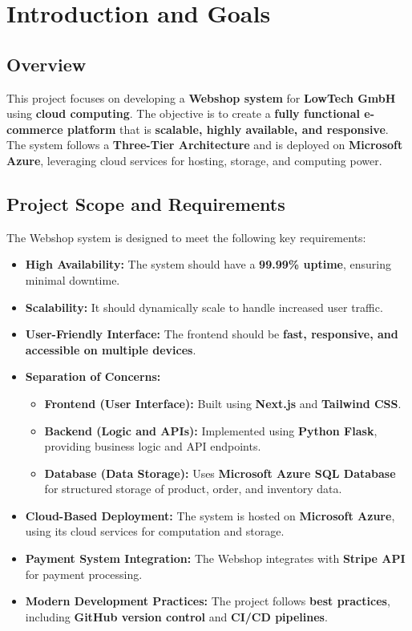 \section{Introduction and Goals}

\subsection{Overview}
This project focuses on developing a \textbf{Webshop system} for \textbf{LowTech GmbH} using \textbf{cloud computing}. The objective is to create a \textbf{fully functional e-commerce platform} that is \textbf{scalable, highly available, and responsive}. The system follows a \textbf{Three-Tier Architecture} and is deployed on \textbf{Microsoft Azure}, leveraging cloud services for hosting, storage, and computing power.

\subsection{Project Scope and Requirements}
The Webshop system is designed to meet the following key requirements:

\begin{itemize}
    \item \textbf{High Availability:} The system should have a \textbf{99.99\% uptime}, ensuring minimal downtime.
    \item \textbf{Scalability:} It should dynamically scale to handle increased user traffic.
    \item \textbf{User-Friendly Interface:} The frontend should be \textbf{fast, responsive, and accessible on multiple devices}.
    \item \textbf{Separation of Concerns:}
    \begin{itemize}
        \item \textbf{Frontend (User Interface):} Built using \textbf{Next.js} and \textbf{Tailwind CSS}.
        \item \textbf{Backend (Logic and APIs):} Implemented using \textbf{Python Flask}, providing business logic and API endpoints.
        \item \textbf{Database (Data Storage):} Uses \textbf{Microsoft Azure SQL Database} for structured storage of product, order, and inventory data.
    \end{itemize}
    \item \textbf{Cloud-Based Deployment:} The system is hosted on \textbf{Microsoft Azure}, using its cloud services for computation and storage.
    \item \textbf{Payment System Integration:} The Webshop integrates with \textbf{Stripe API} for payment processing.
    \item \textbf{Modern Development Practices:} The project follows \textbf{best practices}, including \textbf{GitHub version control} and \textbf{CI/CD pipelines}.
\end{itemize}

